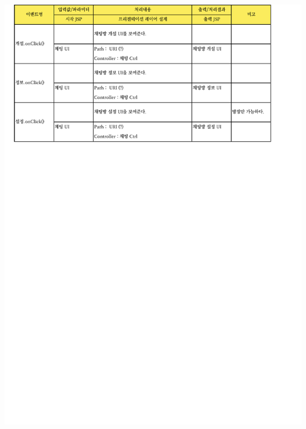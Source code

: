 {{{{{{{{{{{{{{{{{{{{{{{{{{{{{{{{{{{{{{{{{{{{{{{{{{{{{{{{{{{{{{{{\includegraphics[width=20cm]{./Figure/Analysis/Display/chat/chat_03.pdf} \\
}}}}}}}}}}}}}}}}}}}}}}}}}}}}}}}}}}}}}}}}}}}}}}}}}}}}}}}}}}}}}}}}
